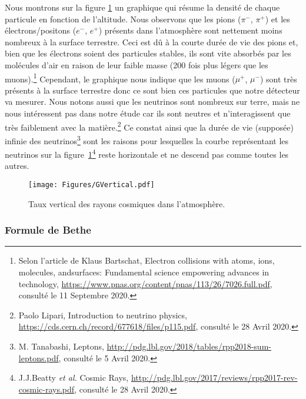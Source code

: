 \documentclass[a4paper, 12pt]{article}
\begin{document}
\begin{spacing}{1.5}
Nous montrons sur la figure \ref{fig:verticalflux} un graphique qui résume la densité de chaque particule en fonction de l'altitude. Nous observons que les pions ($\pi^-$, $\pi^+$) et les électrons/positons ($e^-$, $e^+$) présents dans l'atmosphère sont nettement moins nombreux à la surface terrestre. Ceci est dû à la courte durée de vie des pions et, bien que les électrons soient des particules stables, ils sont vite absorbés par les molécules d'air en raison de leur faible masse (200 fois plus légers que les muons).\footnote{Selon l'article de Klaus Bartschat, Electron collisions with atoms, ions, molecules, andsurfaces: Fundamental science empowering advances in technology, \url{https://www.pnas.org/content/pnas/113/26/7026.full.pdf}, consulté le 11 Septembre 2020.} Cependant, le graphique nous indique que les muons ($\mu^+$, $\mu^-$) sont très présents à la surface terrestre donc ce sont bien ces particules que notre détecteur va mesurer. Nous notons aussi que les neutrinos sont nombreux sur terre, mais ne nous intéressent pas dans notre étude car ils sont neutres et n’interagissent que très faiblement avec la matière.\footnote{Paolo Lipari, Introduction to neutrino physics, \url{https://cds.cern.ch/record/677618/files/p115.pdf}, consulté le 28 Avril 2020.} Ce constat ainsi que la durée de vie (supposée) infinie des neutrinos\footnote{M. Tanabashi, Leptons, \url{http://pdg.lbl.gov/2018/tables/rpp2018-sum-leptons.pdf}, consulté le 5 Avril 2020.} sont les raisons pour lesquelles la courbe représentant les neutrinos sur la figure~\ref{fig:verticalflux}\footnote{J.J.Beatty \emph{et al.} Cosmic Rays, \url{http://pdg.lbl.gov/2017/reviews/rpp2017-rev-cosmic-rays.pdf}, consulté le 28 Avril 2020.} reste horizontale et ne descend pas comme toutes les autres.


\begin{figure}[t]
\begin{center}
\texttt{[image: Figures/GVertical.pdf]}
\vspace{-0.2cm}
\caption{\label{fig:verticalflux} Taux vertical des rayons cosmiques dans l'atmosphère.}
\end{center}
\end{figure}


\subsubsection{Formule de Bethe}


\end{spacing}
\end{document}
